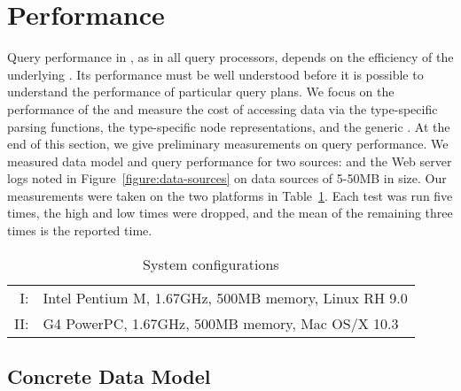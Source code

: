 \section{Performance}
\label{section:performance}

Query performance in \padx{}, as in all query processors, depends on
the efficiency of the underlying \condm{}.  Its performance must be
well understood before it is possible to understand the performance of
particular query plans. We focus on the performance of the \condm{}
and measure the cost of accessing data via the \pads{} type-specific
parsing functions, the \padx{} type-specific node representations, and
the generic \padx{} \condm{}.  At the end of this section, we give
preliminary measurements on query performance.  We measured data model
and query performance for two \pads{} sources: \dibbler{} and the Web
server logs noted in Figure~\ref{figure:data-sources} on data sources
of 5-50MB in size.  Our measurements were taken on the two platforms
in Table~\ref{tab:config}.  Each test was run five times, the high and
low times were dropped, and the mean of the remaining three times is
the reported time.
\begin{table}
\begin{center}
\begin{tabular}{rl}
I: & Intel Pentium M, 1.67GHz, 500MB memory, Linux RH 9.0 \\ 
II:  & G4 PowerPC, 1.67GHz, 500MB memory, Mac OS/X 10.3 \\ 
\end{tabular}
\end{center}
\caption{System configurations}
\label{tab:config}
\end{table}

\subsection{Concrete Data Model} 


